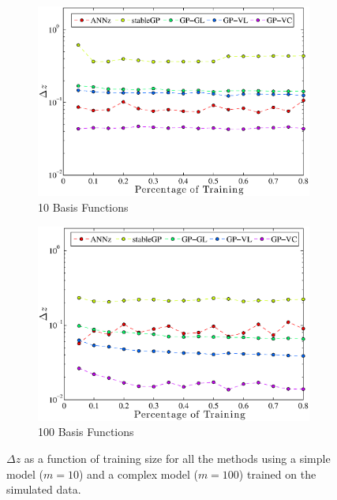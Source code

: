\documentclass[useAMS,usenatbib,fleqn]{mn2e}
\begin{document}
\begin{figure}
        \centering
        \begin{subfigure}[b]{\columnwidth}
                \includegraphics[width=\textwidth]{figures/percentage10}
                \caption{10 Basis Functions}
                \label{fig-training-percentage-10}
        \end{subfigure}	
        \begin{subfigure}[b]{\columnwidth}
                \includegraphics[width=\textwidth]{figures/percentage100}
                \caption{100 Basis Functions}
                \label{ffig-training-percentage-100}
        \end{subfigure}
       \caption{$\Delta z$ as a function of training size for all the methods using a simple model ($m=10$) and a complex model ($m=100$) trained on the simulated data.}
	\label{fig-normal-balanced}
\end{figure}
\end{document}

